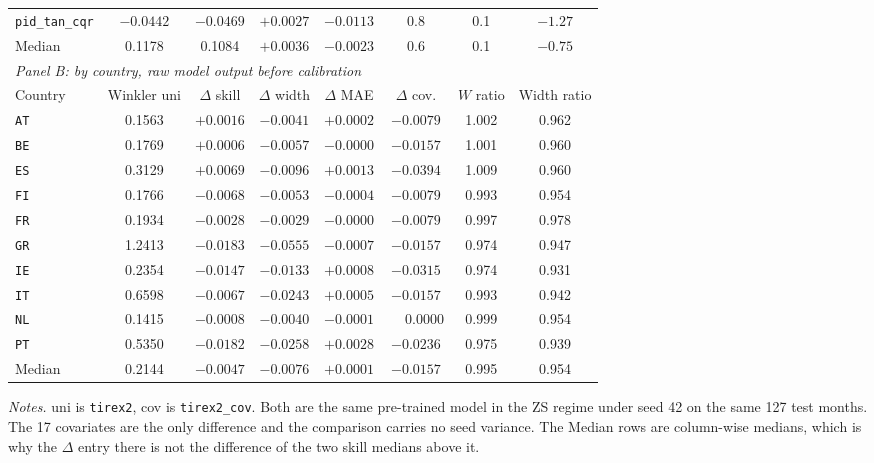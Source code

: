 \begin{table}[t]
\begin{tabular}{lccccccc}
\texttt{pid\_tan\_cqr}  & $-0.0442$ & $-0.0469$ & $+0.0027$ & $-0.0113$ & 0.8 & 0.1 & $-1.27$ \\
\addlinespace
Median & 0.1178 & 0.1084 & $+0.0036$ & $-0.0023$ & 0.6 & 0.1 & $-0.75$ \\
\midrule
\multicolumn{8}{l}{\textit{Panel B: by country, raw model output before calibration}}\\
\cmidrule(lr){1-8}
Country & Winkler uni & $\Delta$ skill & $\Delta$ width & $\Delta$ MAE & $\Delta$ cov. & $W$ ratio & Width ratio \\
\midrule
\texttt{AT} & 0.1563 & $+0.0016$ & $-0.0041$ & $+0.0002$ & $-0.0079$ & 1.002 & 0.962 \\
\texttt{BE} & 0.1769 & $+0.0006$ & $-0.0057$ & $-0.0000$ & $-0.0157$ & 1.001 & 0.960 \\
\texttt{ES} & 0.3129 & $+0.0069$ & $-0.0096$ & $+0.0013$ & $-0.0394$ & 1.009 & 0.960 \\
\texttt{FI} & 0.1766 & $-0.0068$ & $-0.0053$ & $-0.0004$ & $-0.0079$ & 0.993 & 0.954 \\
\texttt{FR} & 0.1934 & $-0.0028$ & $-0.0029$ & $-0.0000$ & $-0.0079$ & 0.997 & 0.978 \\
\texttt{GR} & 1.2413 & $-0.0183$ & $-0.0555$ & $-0.0007$ & $-0.0157$ & 0.974 & 0.947 \\
\texttt{IE} & 0.2354 & $-0.0147$ & $-0.0133$ & $+0.0008$ & $-0.0315$ & 0.974 & 0.931 \\
\texttt{IT} & 0.6598 & $-0.0067$ & $-0.0243$ & $+0.0005$ & $-0.0157$ & 0.993 & 0.942 \\
\texttt{NL} & 0.1415 & $-0.0008$ & $-0.0040$ & $-0.0001$ & $\phantom{+}0.0000$ & 0.999 & 0.954 \\
\texttt{PT} & 0.5350 & $-0.0182$ & $-0.0258$ & $+0.0028$ & $-0.0236$ & 0.975 & 0.939 \\
\addlinespace
Median & 0.2144 & $-0.0047$ & $-0.0076$ & $+0.0001$ & $-0.0157$ & 0.995 & 0.954 \\
\end{tabular}

\vspace{4pt}
{\footnotesize
\begin{minipage}{0.98\textwidth}
\textit{Notes.} uni is \texttt{tirex2}, cov is \texttt{tirex2\_cov}. Both are the
same pre-trained model in the ZS regime under seed 42 on the same 127 test months.
The 17 covariates are the only difference and the comparison carries no seed
variance. The Median rows are column-wise medians, which is why the $\Delta$ entry
there is not the difference of the two skill medians above it.


\end{minipage}}
\end{table}
